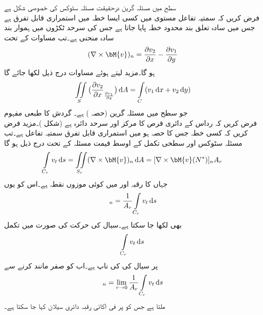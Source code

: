 \quad سطح میں مسئلہ گرین درحقیقت مسئلہ سٹوکس کی خصوصی شکل ہے\\
فرض کریں کہ سمتیہ  تفاعل  مستوی   میں کسی ایسا خطہ میں استمراری قابل تفرق ہے  جس میں سادہ تعلق بند محدود خطہ  پایا جاتا ہے جس کی سرحد  ٹکڑوں میں ہموار بند سادہ منحنی ہے۔تب مساوات  کے تحت
\begin{align*}
(\nabla \times \bM{v})_n=\frac{\partial v_2}{\partial x}-\frac{\partial v_1}{\partial y}
\end{align*}
ہو گا۔مزید  لیتے ہوئے  مساوات  درج ذیل لکھا جائے گا
\begin{align*}
\iint\limits_S \big(\frac{\partial v_2}{\partial x}_\frac{\partial v_1}{\partial y}\big)\dif A=\int\limits_C (v_1\dif x+v_2\dif y)
\end{align*}
جو سطح میں مسئلہ گرین (حصہ ) ہے۔
\quad گردش کا طبعی مفہوم\\
فرض کریں کہ رداس  کے دائری قرص  کا مرکز  اور سرحد دائرہ  ہے (شکل )۔مزید فرض کریں کہ کسی خطہ جس کا   حصہ ہو میں  استمراری قابل تفرق سمتیہ  تفاعل  ہے۔تب مسئلہ سٹوکس اور سطحی تکمل کے اوسط قیمت مسئلہ کے تحت درج ذیل ہو گا
\begin{align*}
\int\limits_{C_r} v_t\dif s=\iint\limits_{S_r} (\nabla \times \bM{v})_n\dif A=[\nabla \times \bM{v}(N^*)]_n A_r
\end{align*}
جہاں  کا رقبہ  اور  میں  کوئی موزوں نقطہ ہے۔اس کو یوں
\begin{align*}
[\nabla \times \bM{v}(N^*)]_n=\frac{1}{A_r}\int\limits_{C_r} v_t\dif s
\end{align*}
بھی لکھا جا سکتا ہے۔سیال کی حرکت کی صورت میں تکمل
\begin{align*}
\int\limits_{C_r}v_t\dif s
\end{align*}
 پر سیال کی  کی ناپ ہے۔اب   کو صفر مانند کرنے سے
\begin{align}
[\nabla \times \bM{v}(N)]_n=\lim_{r\to 0}\frac{1}{A_r}\int\limits_{C_r} v_t\dif s
\end{align}
ملتا ہے جس کو  پر فی اکائی رقبہ  دائری سیلان کہا جا سکتا ہے۔ 
